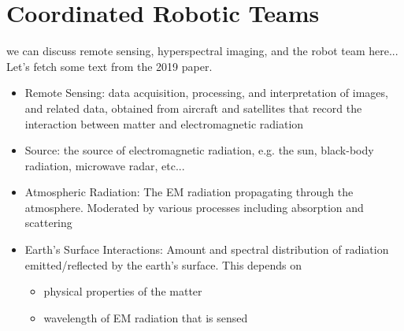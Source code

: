 




\section{Coordinated Robotic Teams}

we can discuss remote sensing, hyperspectral imaging, and the robot team here... Let's fetch some text from the 2019 paper.

\begin{itemize}
\item Remote Sensing: data acquisition, processing, and interpretation of images, and related data, obtained from aircraft and satellites that record the interaction between matter and electromagnetic radiation
\item Source: the source of electromagnetic radiation, e.g. the sun, black-body radiation, microwave radar, etc...
\item Atmospheric Radiation: The EM radiation propagating through the atmosphere. Moderated by various processes including absorption and scattering
\item Earth's Surface Interactions: Amount and spectral distribution of radiation emitted/reflected by the earth's surface. This depends on
  \begin{itemize}
  \item physical properties of the matter
  \item wavelength of EM radiation that is sensed
  \end{itemize}
\end{itemize}



